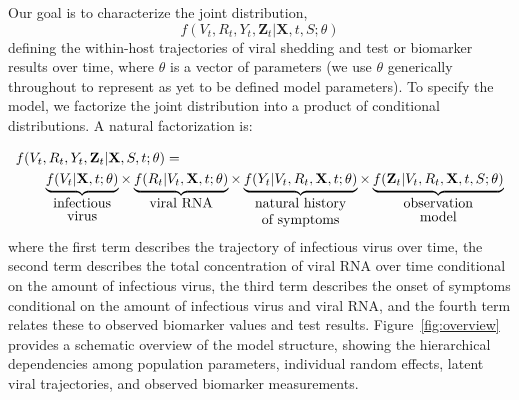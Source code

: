 \documentclass[12pt]{article}
\begin{document}
Our goal is to characterize the joint distribution, 
$$
f(V_t, R_t, Y_t, \mathbf{Z}_t | \mathbf{X}, t, S; \theta)
$$
defining the within-host trajectories of viral shedding and test or biomarker results over time, where $\theta$ is a vector of parameters (we use $\theta$ generically throughout to represent as yet to be defined model parameters). To specify the model, we factorize the joint distribution into a product of conditional distributions. A natural factorization is:

\begin{align*}
    f(&V_t, R_t, Y_t, \mathbf{Z}_t | \mathbf{X}, S, t; \theta) = \\ & \quad \underbrace{f(V_t | \mathbf{X}, t; \theta)}_{\shortstack{infectious \\ virus}} \times \underbrace{f(R_t | V_t, \mathbf{X}, t; \theta)}_{\shortstack{viral RNA}} \times \underbrace{f(Y_t | V_t, R_t, \mathbf{X}, t; \theta)}_{\shortstack{natural history \\ of symptoms}} \times \underbrace{f(\mathbf{Z}_t | V_t, R_t, \mathbf{X}, t, S; \theta)}_{\shortstack{observation \\ model}}
\end{align*}
where the first term describes the trajectory of infectious virus over time, the second term describes the total concentration of viral RNA over time conditional on the amount of infectious virus, the third term describes the onset of symptoms conditional on the amount of infectious virus and viral RNA, and the fourth term relates these to observed biomarker values and test results. Figure~\ref{fig:overview} provides a schematic overview of the model structure, showing the hierarchical dependencies among population parameters, individual random effects, latent viral trajectories, and observed biomarker measurements.
\end{document}

